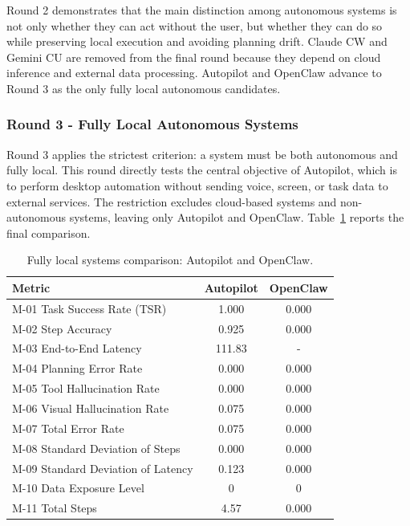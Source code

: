 Round 2 demonstrates that the main distinction among autonomous systems is not only whether they can act without the user, but whether they can do so while preserving local execution and avoiding planning drift. Claude CW and Gemini CU are removed from the final round because they depend on cloud inference and external data processing. Autopilot and OpenClaw advance to Round 3 as the only fully local autonomous candidates.

\subsubsection{Round 3 - Fully Local Autonomous Systems}

Round 3 applies the strictest criterion: a system must be both autonomous and fully local. This round directly tests the central objective of Autopilot, which is to perform desktop automation without sending voice, screen, or task data to external services. The restriction excludes cloud-based systems and non-autonomous systems, leaving only Autopilot and OpenClaw. Table~\ref{tab:local_comparative} reports the final comparison.

\begin{table}[H]
\centering
\begin{tabularx}{\textwidth}{|X|c|c|}
\hline
\textbf{Metric} & \textbf{Autopilot} & \textbf{OpenClaw} \\
\hline
M-01 Task Success Rate (TSR)        & 1.000  & 0.000 \\
\hline
M-02 Step Accuracy                  & 0.925  & 0.000 \\
\hline
M-03 End-to-End Latency             & 111.83 & - \\
\hline
M-04 Planning Error Rate            & 0.000  & 0.000 \\
\hline
M-05 Tool Hallucination Rate        & 0.000  & 0.000 \\
\hline
M-06 Visual Hallucination Rate      & 0.075  & 0.000 \\
\hline
M-07 Total Error Rate               & 0.075  & 0.000 \\
\hline
M-08 Standard Deviation of Steps    & 0.000  & 0.000 \\
\hline
M-09 Standard Deviation of Latency  & 0.123  & 0.000 \\
\hline
M-10 Data Exposure Level            & 0      & 0     \\
\hline
M-11 Total Steps                    & 4.57   & 0.000 \\
\hline
\end{tabularx}
\caption{Fully local systems comparison: Autopilot and OpenClaw.}
\label{tab:local_comparative}
\end{table}

